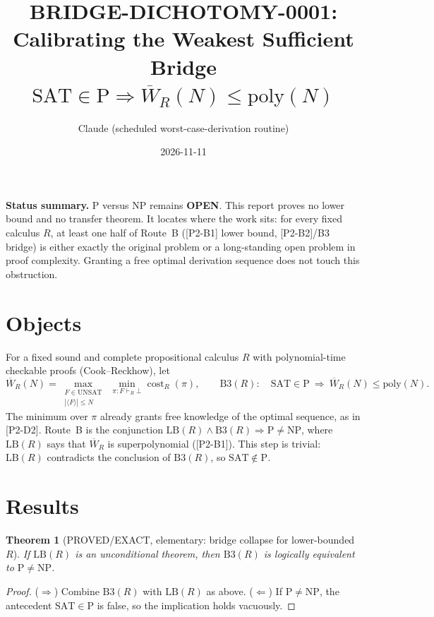 \documentclass[11pt]{article}
\title{BRIDGE-DICHOTOMY-0001: Calibrating the Weakest Sufficient Bridge\\
$\mathrm{SAT}\in\mathrm{P}\Rightarrow\overline W_R(N)\le\mathrm{poly}(N)$}
\author{Claude (scheduled worst-case-derivation routine)}
\date{2026-11-11}
\newtheorem{theorem}{Theorem}
\theoremstyle{remark}\newtheorem{remark}[theorem]{Remark}
\begin{document}
\maketitle

\noindent\textbf{Status summary.} P versus NP remains \textbf{OPEN}. This report proves
no lower bound and no transfer theorem. It locates where the work sits: for every fixed
calculus $R$, at least one half of Route~B ([P2-B1] lower bound, [P2-B2]/B3 bridge) is
either exactly the original problem or a long-standing open problem in proof complexity.
Granting a free optimal derivation sequence does not touch this obstruction.

\section{Objects}
For a fixed sound and complete propositional calculus $R$ with polynomial-time checkable
proofs (Cook--Reckhow), let
\[
\overline W_R(N)=\max_{\substack{F\in\mathrm{UNSAT}\\|\langle F\rangle|\le N}}\
\min_{\pi:F\vdash_R\bot}\operatorname{cost}_R(\pi),
\qquad
\mathrm{B3}(R):\quad \mathrm{SAT}\in\mathrm P\ \Longrightarrow\ \overline W_R(N)\le\mathrm{poly}(N).
\]
The minimum over $\pi$ already grants free knowledge of the optimal sequence, as in
[P2-D2]. Route~B is the conjunction
$\mathrm{LB}(R)\wedge\mathrm{B3}(R)\Rightarrow \mathrm{P}\ne\mathrm{NP}$, where
$\mathrm{LB}(R)$ says that $\overline W_R$ is superpolynomial ([P2-B1]). This step is trivial:
$\mathrm{LB}(R)$ contradicts the conclusion of $\mathrm{B3}(R)$, so $\mathrm{SAT}\notin\mathrm P$.

\section{Results}

\begin{theorem}[PROVED/EXACT, elementary: bridge collapse for lower-bounded $R$]\label{thm:collapse}
If $\mathrm{LB}(R)$ is an unconditional theorem, then $\mathrm{B3}(R)$ is logically
equivalent to $\mathrm P\ne\mathrm{NP}$.
\end{theorem}
\begin{proof}
($\Rightarrow$) Combine $\mathrm{B3}(R)$ with $\mathrm{LB}(R)$ as above.
($\Leftarrow$) If $\mathrm P\ne\mathrm{NP}$, the antecedent $\mathrm{SAT}\in\mathrm P$ is false,
so the implication holds vacuously.
\end{proof}
\end{document}
